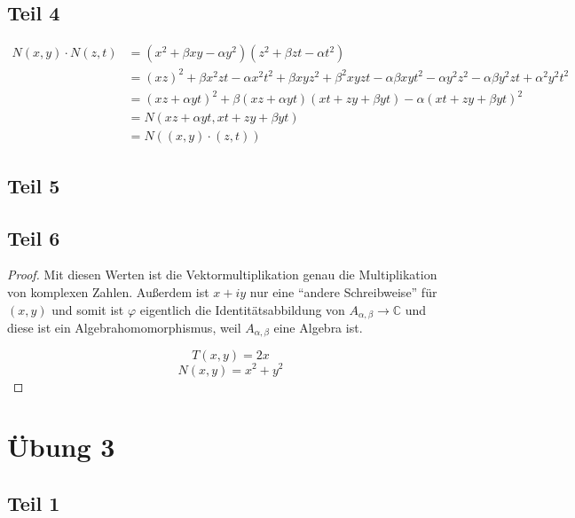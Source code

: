 \documentclass[10pt,a4paper]{article}
\begin{document}
\subsection*{Teil 4}

\begin{align*}
N(x, y) \cdot N(z, t) & = (x^{2} + \beta xy - \alpha y^{2})(z^{2} + \beta zt - \alpha t^{2})\\
& = (xz)^{2} + \beta x^{2} zt - \alpha x^{2}t^{2} + \beta xyz^{2} + \beta^{2} xyzt - \alpha \beta xyt^{2} - \alpha y^{2} z^{2} - \alpha \beta y^{2} zt + \alpha^{2} y^{2} t^{2}\\
& = (xz + \alpha yt)^{2} + \beta (xz + \alpha yt)(xt + zy + \beta yt) - \alpha (xt + zy + \beta yt)^{2}\\
& = N(xz + \alpha yt, xt + zy + \beta yt)\\
& = N((x, y) \cdot (z, t))
\end{align*}

\subsection*{Teil 5}

\subsection*{Teil 6}

\begin{proof}
Mit diesen Werten ist die Vektormultiplikation genau die Multiplikation von komplexen Zahlen.
Außerdem ist $x + iy$ nur eine ``andere Schreibweise'' für $(x, y)$ und somit ist $\varphi$ eigentlich die Identitätsabbildung von $A_{\alpha, \beta} \rightarrow \mathbb{C}$ und diese ist ein Algebrahomomorphismus, weil $A_{\alpha, \beta}$ eine Algebra ist.

\begin{equation}
T(x, y) = 2x
\end{equation}
\begin{equation}
N(x, y) = x^{2} + y^{2}
\end{equation}
\end{proof}

\section*{Übung 3}

\subsection*{Teil 1}
\end{document}
